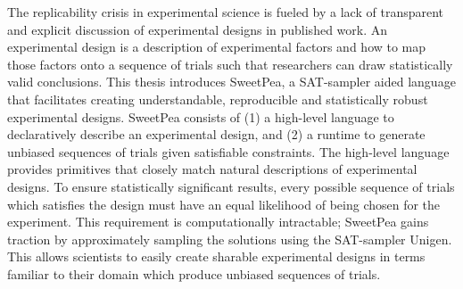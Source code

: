 
The replicability crisis in experimental science is fueled by a lack of transparent and explicit discussion of experimental designs in published work. An experimental design is a description of experimental factors and how to map those factors onto a sequence of trials such that researchers can draw statistically valid conclusions. This thesis introduces SweetPea, a SAT-sampler aided language that facilitates creating understandable, reproducible and statistically robust experimental designs. SweetPea consists of (1) a high-level language to declaratively describe an experimental design, and (2) a runtime to generate unbiased sequences of trials given satisfiable constraints. The high-level language provides primitives that closely match natural descriptions of experimental designs. To ensure statistically significant results, every possible sequence of trials which satisfies the design must have an equal likelihood of being chosen for the experiment. This requirement is computationally intractable; SweetPea gains traction by approximately sampling the solutions using the SAT-sampler Unigen. This allows scientists to easily create sharable experimental designs in terms familiar to their domain which produce unbiased sequences of trials.
